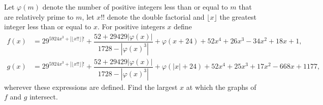 Let $\varphi(m)$ denote the number of positive integers less than or equal to $m$ that are relatively prime to $m$, let $x!!$ denote the double factorial and $\lfloor x\rfloor$ the greatest integer less than or equal to $x$. For positive integers $x$ define
\begin{align*}
f(x)&=29^{5924x^3+|\lfloor x!!\rfloor|!}+\dfrac{52+29429|\varphi(x)|}{1728-|\varphi(x)^3|}+\varphi(x+24)+52x^4+26x^3-34x^2+18x+1,\\
g(x)&=29^{5924x^3+|\lfloor x!!\rfloor|!}+\dfrac{52+29429|\varphi(x)|}{1728-|\varphi(x)^3|}+\varphi(|x|+24)+52x^4+25x^3+17x^2-668x+1177,
\end{align*}
wherever these expressions are defined. Find the largest $x$ at which the graphs of $f$ and $g$ intersect.

